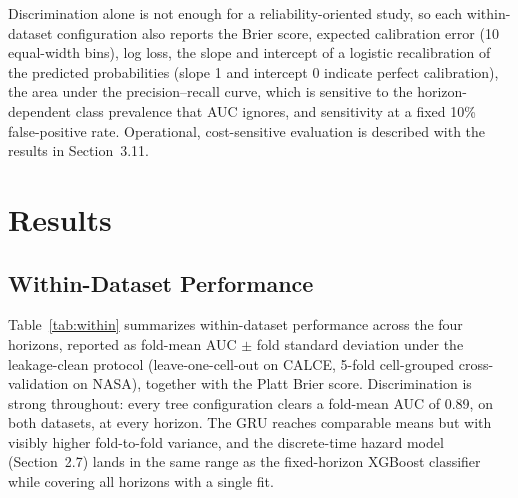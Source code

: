 \documentclass[IJPHM, 2014, 00]{PHMSociety}
\begin{document}
Discrimination alone is not enough for a reliability-oriented study, so each within-dataset configuration also reports the Brier score, expected calibration error (10 equal-width bins), log loss, the slope and intercept of a logistic recalibration of the predicted probabilities (slope 1 and intercept 0 indicate perfect calibration), the area under the precision--recall curve, which is sensitive to the horizon-dependent class prevalence that AUC ignores, and sensitivity at a fixed 10\% false-positive rate. Operational, cost-sensitive evaluation is described with the results in Section~3.11.

\section{Results}

\subsection{Within-Dataset Performance}
Table~\ref{tab:within} summarizes within-dataset performance across the four horizons, reported as fold-mean AUC $\pm$ fold standard deviation under the leakage-clean protocol (leave-one-cell-out on CALCE, 5-fold cell-grouped cross-validation on NASA), together with the Platt Brier score. Discrimination is strong throughout: every tree configuration clears a fold-mean AUC of 0.89, on both datasets, at every horizon. The GRU reaches comparable means but with visibly higher fold-to-fold variance, and the discrete-time hazard model (Section~2.7) lands in the same range as the fixed-horizon XGBoost classifier while covering all horizons with a single fit.
\end{document}

